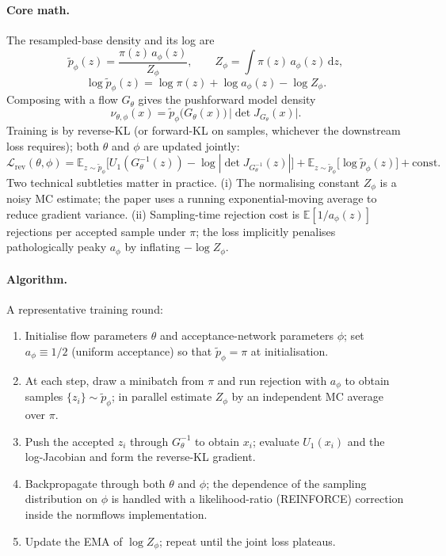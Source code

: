 \documentclass[11pt,letterpaper]{article}
\newcommand{\E}{\mathbb{E}}
\newcommand{\dd}{\mathrm{d}}
\theoremstyle{plain}
\begin{document}
\paragraph{Core math.} The resampled-base density and its log are
\[
  \tilde p_\phi(z) = \frac{\pi(z)\,a_\phi(z)}{Z_\phi},\qquad
  Z_\phi = \int\pi(z)\,a_\phi(z)\,\dd z,
\]
\[
  \log\tilde p_\phi(z) = \log\pi(z) + \log a_\phi(z) - \log Z_\phi.
\]
Composing with a flow $G_\theta$ gives the pushforward model density
\[
  \nu_{\theta,\phi}(x) = \tilde p_\phi\!\big(G_\theta(x)\big)\,\big|\det J_{G_\theta}(x)\big|.
\]
Training is by reverse-KL (or forward-KL on samples, whichever the downstream
loss requires); both $\theta$ and $\phi$ are updated jointly:
\[
  \mathcal L_{\mathrm{rev}}(\theta,\phi)
   = \E_{z\sim\tilde p_\phi}\!\big[U_1(G_\theta^{-1}(z)) - \log|\det J_{G_\theta^{-1}}(z)|\big]
   + \E_{z\sim\tilde p_\phi}\!\big[\log\tilde p_\phi(z)\big] + \text{const}.
\]
Two technical subtleties matter in practice. (i) The normalising constant
$Z_\phi$ is a noisy MC estimate; the paper uses a running exponential-moving
average to reduce gradient variance. (ii) Sampling-time rejection cost is
$\E[1/a_\phi(z)]$ rejections per accepted sample under $\pi$; the loss
implicitly penalises pathologically peaky $a_\phi$ by inflating
$-\log Z_\phi$.

\paragraph{Algorithm.} A representative training round:
\begin{enumerate}\setlength{\itemsep}{2pt}
  \item Initialise flow parameters $\theta$ and acceptance-network parameters
    $\phi$; set $a_\phi\equiv 1/2$ (uniform acceptance) so that
    $\tilde p_\phi=\pi$ at initialisation.
  \item At each step, draw a minibatch from $\pi$ and run rejection with
    $a_\phi$ to obtain samples $\{z_i\}\sim\tilde p_\phi$; in parallel estimate
    $Z_\phi$ by an independent MC average over $\pi$.
  \item Push the accepted $z_i$ through $G_\theta^{-1}$ to obtain $x_i$; evaluate
    $U_1(x_i)$ and the log-Jacobian and form the reverse-KL gradient.
  \item Backpropagate through both $\theta$ and $\phi$; the dependence of the
    sampling distribution on $\phi$ is handled with a likelihood-ratio (REINFORCE)
    correction inside the normflows implementation.
  \item Update the EMA of $\log Z_\phi$; repeat until the joint loss
    plateaus.
\end{enumerate}
\end{document}
